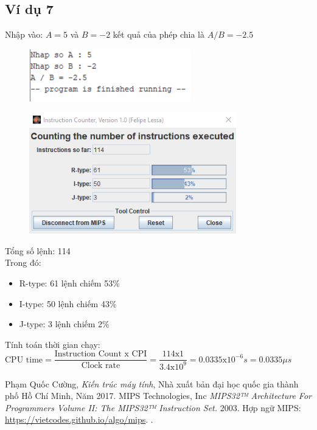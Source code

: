 \documentclass[a4paper]{article}
\begin{document}
\subsection{Ví dụ 7}
Nhập vào: $A = 5$ và $B = -2$ kết quả của phép chia là $A / B = -2.5$
\begin{center}
	\begin{figure}[h!]
		\begin{center}
			\includegraphics[width=7cm]{Images/14.png}
		\end{center}
	\end{figure}
\end{center}
\begin{center}
	\begin{figure}[h!]
		\begin{center}
			\includegraphics[width=9cm]{Images/15.png}
		\end{center}
	\end{figure}
\end{center}
Tổng số lệnh: 114\\
Trong đó:
\begin{itemize}
	\item R-type: 61 lệnh chiếm 53\%
	\item I-type: 50 lệnh chiếm 43\%
	\item J-type: 3 lệnh chiếm 2\%
\end{itemize}
Tính toán thời gian chạy:\\
$\text{CPU time} = \dfrac{\text{Instruction Count x CPI}}{\text{Clock rate}} = \dfrac{114\text{x}1}{3.4\text{x}10^9} = 0.0335 \text{x}10^{-6} s = 0.0335 \mu s$


\newpage
\begin{thebibliography}{99999}
	 Phạm Quốc Cường, {\em Kiến trúc máy tính}, Nhà xuất bản đại học quốc gia thành phố Hồ Chí Minh, Năm 2017.
	 MIPS Technologies, Inc {\em MIPS32™ Architecture For Programmers Volume II: The MIPS32™ Instruction Set.}  2003.
	 {Hợp ngữ MIPS: \url{https://vietcodes.github.io/algo/mips}}.
	.

	
\end{thebibliography}
\end{document}
